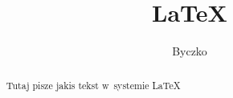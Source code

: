 \documentclass{aritcle}
\title{\LaTeX}
\author{Byczko}
\date{}
\begin{document}
\maketitle
\begin{abstract}
Tutaj pisze jakis tekst
w~systemie \LaTeX    
\end{abstract}
    
\end{document}
